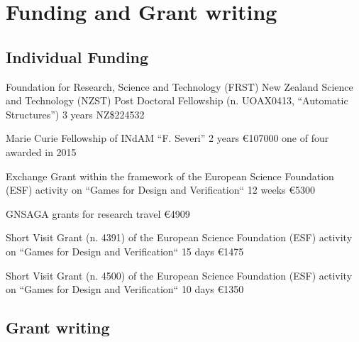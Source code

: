 \documentclass[10pt,a4paper,sans]{moderncv}
\begin{document}
\section{Funding and Grant writing}
\subsection{Individual Funding}
{Foundation for Research, Science and Technology (FRST) New Zealand Science and Technology (NZST) Post Doctoral Fellowship (n. UOAX0413, ``Automatic Structures'')}
{3 years}
{NZ\$224532}
{}{}


{Marie Curie Fellowship of INdAM ``F. Severi''}
{2 years}
{\euro{107000}}
{one of four awarded in 2015}{}


{Exchange Grant within the framework of the European Science Foundation (ESF) activity on ``Games for Design and Verification``}
{12 weeks}
{\euro{5300}}
{}{}

{GNSAGA grants for research travel}
{}
{\euro{4909}}
{}{}

{Short Visit Grant (n. 4391) of the European Science Foundation (ESF) activity on ``Games for Design and Verification``}
{15 days}
{\euro{1475}}{}{}

{Short Visit Grant (n. 4500) of the European Science Foundation (ESF) activity on ``Games for Design and Verification``}
{10 days}
{\euro{1350}}{}{}



\subsection{Grant writing}
\end{document}

